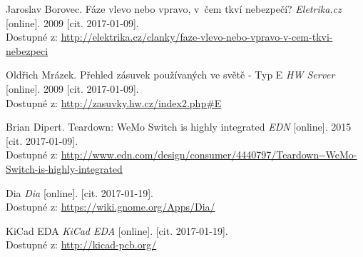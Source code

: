 \documentclass[12pt,a4paper,oneside]{article}
\begin{document}
\begin{thebibliography}{99}
Jaroslav Borovec. Fáze vlevo nebo vpravo, v~čem tkví nebezpečí? \emph{Eletrika.cz} [online]. 2009 [cit. 2017-01-09]. \\ Dostupné z: \url{http://elektrika.cz/clanky/faze-vlevo-nebo-vpravo-v-cem-tkvi-nebezpeci}

Oldřich Mrázek. Přehled zásuvek používaných ve světě - Typ E \emph{HW Server} [online]. 2009 [cit. 2017-01-09]. \\ Dostupné z: \url{http://zasuvky.hw.cz/index2.php#E}

Brian Dipert. Teardown: WeMo Switch is highly integrated \emph{EDN} [online]. 2015 [cit. 2017-01-09]. \\ Dostupné z: \url{http://www.edn.com/design/consumer/4440797/Teardown--WeMo-Switch-is-highly-integrated}

Dia \emph{Dia} [online]. [cit. 2017-01-19]. \\ Dostupné z: \url{https://wiki.gnome.org/Apps/Dia/}

KiCad EDA \emph{KiCad EDA} [online]. [cit. 2017-01-19]. \\ Dostupné z: \url{http://kicad-pcb.org/}

\end{thebibliography}

\newpage

\listoffigures


\listoftables

\end{document}
